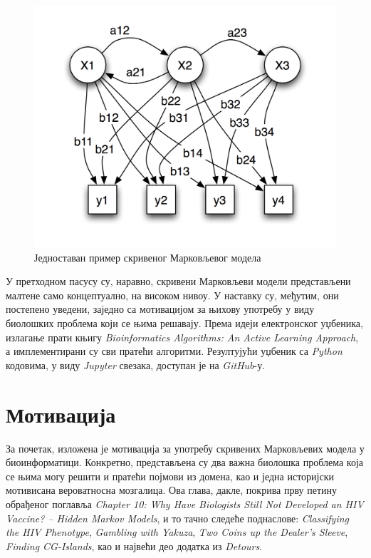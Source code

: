 \documentclass[12pt,oneside]{memoir}
\begin{document}
\begin{CJK}{UTF8}{ipxm}
\begin{figure}[H]
  \centering
  \includegraphics[width=.75\textwidth]{hmm.png}
  \caption{Једноставан пример скривеног Марковљевог модела\cite{hmm}}
  \label{fig:hmm}
\end{figure}

У претходном пасусу су, наравно, скривени Марковљеви модели представљени малтене само концептуално, на високом нивоу. У наставку су, међутим, они постепено уведени, заједно са мотивацијом за њихову употребу у виду биолошких проблема који се њима решавају. Према идеји електронског уџбеника, излагање прати књигу \textit{Bioinformatics Algorithms: An Active Learning Approach}, а имплементирани су сви пратећи алгоритми. Резултујући уџбеник са \textit{Python} кодовима, у виду \textit{Jupyter} свезака, доступан је на \textit{GitHub}-у\cite{vasovich2021}.

\chapter{Мотивација}
За почетак, изложена је мотивација за употребу скривених Марковљевих модела у биоинформатици. Конкретно, представљена су два важна биолошка проблема која се њима могу решити и пратећи појмови из домена, као и једна историјски мотивисана вероватносна мозгалица. Ова глава, дакле, покрива прву петину обрађеног поглавља \textit{Chapter 10: Why Have Biologists Still Not Developed an HIV Vaccine? -- Hidden Markov Models}, и то тачно следеће поднаслове: \textit{Classifying the HIV Phenotype}, \textit{Gambling with Yakuza}, \textit{Two Coins up the Dealer’s Sleeve}, \textit{Finding CG-Islands}, као и највећи део додатка из \textit{Detours}.


\end{CJK}
\end{document}
